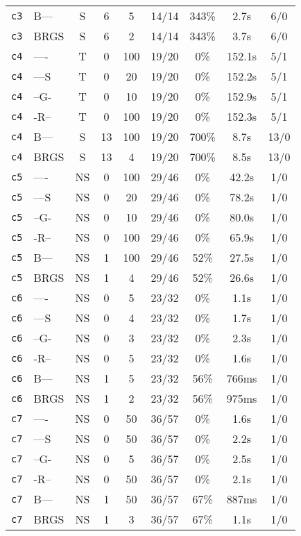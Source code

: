 \begin{tabular}{llccccccc}
\texttt{c3} & B--- & S & 6 & 5 & 14/14 & 343\% & 2.7s & 6/0 \\
\texttt{c3} & BRGS & S & 6 & 2 & 14/14 & 343\% & 3.7s & 6/0 \\
\texttt{c4} & ---- & T & 0 & 100 & 19/20 & 0\% & 152.1s & 5/1 \\
\texttt{c4} & ---S & T & 0 & 20 & 19/20 & 0\% & 152.2s & 5/1 \\
\texttt{c4} & --G- & T & 0 & 10 & 19/20 & 0\% & 152.9s & 5/1 \\
\texttt{c4} & -R-- & T & 0 & 100 & 19/20 & 0\% & 152.3s & 5/1 \\
\texttt{c4} & B--- & S & 13 & 100 & 19/20 & 700\% & 8.7s & 13/0 \\
\texttt{c4} & BRGS & S & 13 & 4 & 19/20 & 700\% & 8.5s & 13/0 \\
\texttt{c5} & ---- & NS & 0 & 100 & 29/46 & 0\% & 42.2s & 1/0 \\
\texttt{c5} & ---S & NS & 0 & 20 & 29/46 & 0\% & 78.2s & 1/0 \\
\texttt{c5} & --G- & NS & 0 & 10 & 29/46 & 0\% & 80.0s & 1/0 \\
\texttt{c5} & -R-- & NS & 0 & 100 & 29/46 & 0\% & 65.9s & 1/0 \\
\texttt{c5} & B--- & NS & 1 & 100 & 29/46 & 52\% & 27.5s & 1/0 \\
\texttt{c5} & BRGS & NS & 1 & 4 & 29/46 & 52\% & 26.6s & 1/0 \\
\texttt{c6} & ---- & NS & 0 & 5 & 23/32 & 0\% & 1.1s & 1/0 \\
\texttt{c6} & ---S & NS & 0 & 4 & 23/32 & 0\% & 1.7s & 1/0 \\
\texttt{c6} & --G- & NS & 0 & 3 & 23/32 & 0\% & 2.3s & 1/0 \\
\texttt{c6} & -R-- & NS & 0 & 5 & 23/32 & 0\% & 1.6s & 1/0 \\
\texttt{c6} & B--- & NS & 1 & 5 & 23/32 & 56\% & 766ms & 1/0 \\
\texttt{c6} & BRGS & NS & 1 & 2 & 23/32 & 56\% & 975ms & 1/0 \\
\texttt{c7} & ---- & NS & 0 & 50 & 36/57 & 0\% & 1.6s & 1/0 \\
\texttt{c7} & ---S & NS & 0 & 50 & 36/57 & 0\% & 2.2s & 1/0 \\
\texttt{c7} & --G- & NS & 0 & 5 & 36/57 & 0\% & 2.5s & 1/0 \\
\texttt{c7} & -R-- & NS & 0 & 50 & 36/57 & 0\% & 2.1s & 1/0 \\
\texttt{c7} & B--- & NS & 1 & 50 & 36/57 & 67\% & 887ms & 1/0 \\
\texttt{c7} & BRGS & NS & 1 & 3 & 36/57 & 67\% & 1.1s & 1/0 \\

\end{tabular}
